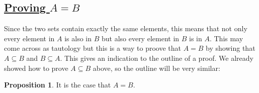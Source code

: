 \documentclass{amsart} %
\theoremstyle{definition} %
\theoremstyle{definition}
\newtheorem*{prpn}{Proposition}
\theoremstyle{remark} %
\begin{document}
\bigskip \bigskip \bigskip \bigskip

\subsection{\underline{Proving $A = B$}}\hspace*{\fill}

 Since the two sets contain exactly the same elements, this means that not only every element in $A$ is also in $B$ but also every element in $B$ is in $A$. This may come across as tautology but this is a way to proove that $A = B$ by showing that $A \subseteq B$ and $B \subseteq A$. This gives an indication to the outline of a proof. We already showed how to prove $A \subseteq B$ above, so the outline will be very similar:

\begin{prpn}
      It is the case that $A = B$.
\end{prpn}
\end{document}
